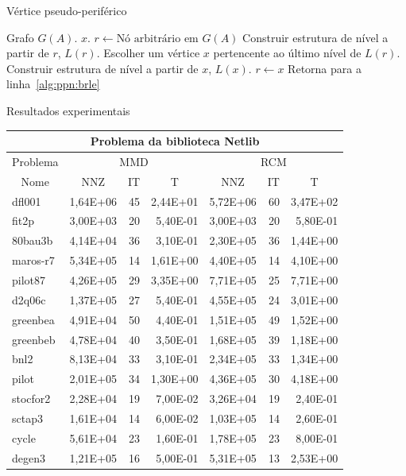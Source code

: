 \documentclass[10pt]{beamer}
\begin{document}
\begin{frame}[fragile]{Vértice pseudo-periférico}
  \begin{algorithmic}[1]
      \REQUIRE Grafo $G(A)$.
      \ENSURE $x$.
      \STATE $r \longleftarrow \text{Nó arbitrário em }G(A)$
      \STATE Construir estrutura de nível a partir de $r$, $L(r)$.
      \label{alg:ppn:brle}
      \STATE Escolher um vértice $x$ pertencente ao último nível de
      $L(r)$.
      \STATE Construir estrutura de nível a partir de $x$, $L(x)$.
          \STATE $r \longleftarrow x$
          \STATE Retorna para a linha~\ref{alg:ppn:brle}
      \ENDIF
  \end{algorithmic}
\end{frame}

\begin{frame}[fragile]{Resultados experimentais}
  \begin{center}
\begin{tabular}{|l|r|r|r|r|r|r|}
\hline
\multicolumn{7}{|c|}{Problema da biblioteca Netlib} \\ \hline
\multicolumn{1}{|c|}{Problema} & \multicolumn{3}{|c|}{MMD} &         \multicolumn{3}{|c|}{RCM} \\ \hline
\multicolumn{1}{|c|}{Nome} &
        \multicolumn{1}{|c|}{NNZ} & \multicolumn{1}{|c|}{IT} &
        \multicolumn{1}{|c|}{T} &
        \multicolumn{1}{|c|}{NNZ} & \multicolumn{1}{|c|}{IT} &
        \multicolumn{1}{|c|}{T} \\ \hline
dfl001       & 1,64E+06 & 45 & 2,44E+01 & 5,72E+06 & 60 & 3,47E+02 \\ \hline
fit2p        & 3,00E+03 & 20 & 5,40E-01 & 3,00E+03 & 20 & 5,80E-01 \\ \hline
80bau3b      & 4,14E+04 & 36 & 3,10E-01 & 2,30E+05 & 36 & 1,44E+00 \\ \hline
maros-r7     & 5,34E+05 & 14 & 1,61E+00 & 4,40E+05 & 14 & 4,10E+00 \\ \hline
pilot87      & 4,26E+05 & 29 & 3,35E+00 & 7,71E+05 & 25 & 7,71E+00 \\ \hline
d2q06c       & 1,37E+05 & 27 & 5,40E-01 & 4,55E+05 & 24 & 3,01E+00 \\ \hline
greenbea     & 4,91E+04 & 50 & 4,40E-01 & 1,51E+05 & 49 & 1,52E+00 \\ \hline
greenbeb     & 4,78E+04 & 40 & 3,50E-01 & 1,68E+05 & 39 & 1,18E+00 \\ \hline
bnl2         & 8,13E+04 & 33 & 3,10E-01 & 2,34E+05 & 33 & 1,34E+00 \\ \hline
pilot        & 2,01E+05 & 34 & 1,30E+00 & 4,36E+05 & 30 & 4,18E+00 \\ \hline
stocfor2     & 2,28E+04 & 19 & 7,00E-02 & 3,26E+04 & 19 & 2,40E-01 \\ \hline
sctap3       & 1,61E+04 & 14 & 6,00E-02 & 1,03E+05 & 14 & 2,60E-01 \\ \hline
cycle        & 5,61E+04 & 23 & 1,60E-01 & 1,78E+05 & 23 & 8,00E-01 \\ \hline
degen3       & 1,21E+05 & 16 & 5,00E-01 & 5,31E+05 & 13 & 2,53E+00 \\ \hline
\end{tabular}
  \end{center}
\end{frame}
\end{document}
